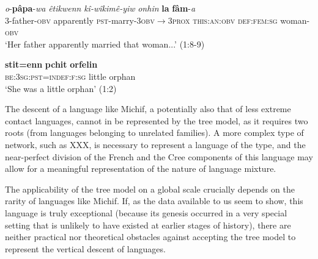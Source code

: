 \documentclass[svgnames,12pt]{scrartcl}
\begin{document}
\begin{exe}
\ex \gll \textit{o}-\textbf{pâpa}-\textit{wa} \textit{êtikwenn} \textit{kî-wîkimê-yiw} \textit{onhin} \textbf{la} \textbf{fâm}-\textit{a} \\
3-father-\textsc{obv} apparently \textsc{pst}-marry-\textsc{3obv$\rightarrow$3prox} \textsc{this:an:obv} 
\textsc{def:fem:sg} woman-\textsc{obv}\\
\glt ‘Her father apparently married that woman...’ (1:8-9)
\end{exe}

\begin{exe}
\ex \gll \textbf{stit=enn} \textbf{pchit} \textbf{orfelin} \\
\textsc{be:3sg:pst=indef:f:sg} little orphan \\
\glt ‘She was a little orphan’ (1:2)
\end{exe} 

The descent of a language like Michif, a potentially also that of less extreme contact languages, cannot in be represented by the tree model, as it requires two roots (from languages belonging to unrelated families). A more complex type of network, such as XXX, is necessary to represent a language of the type, and the near-perfect division of the French and the Cree components of this language may allow for a meaningful representation of the nature of language mixture.

The applicability of the tree model on a global scale crucially depends on the rarity of languages like Michif. If, as the data available to us seem to show, this language is truly exceptional (because its genesis occurred in a very special setting that is unlikely to have existed at earlier stages of history), there are neither practical nor theoretical obstacles against accepting the tree model to represent the vertical descent of languages.



\end{document}
